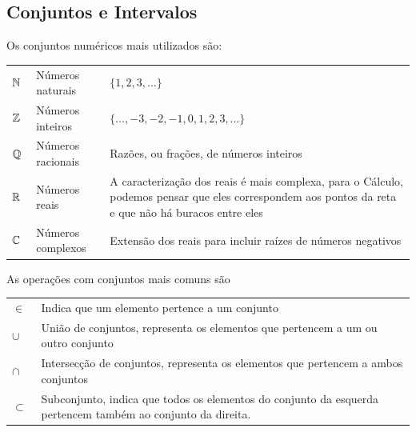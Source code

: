 \subsection*{Conjuntos e Intervalos}
\label{sub:conjuntos_intervalos}

Os conjuntos numéricos mais utilizados são:

{\centering
\begin{tabular}{llp{10cm}}
  \emph{$\mathbb{N}\;$} & Números naturais  & $\{1, 2, 3, \dots\}$ \\
  \emph{$\mathbb{Z}\;$} & Números inteiros  & $\{\dots, -3, -2, -1, 0, 1, 2, 3, \dots\}$ \\
  \emph{$\mathbb{Q}\;$} & Números racionais & Razões, ou frações, de números inteiros \\
  \emph{$\mathbb{R}\;$} & Números reais     & A caracterização dos reais é mais complexa,
                                      para o Cálculo, podemos pensar que eles correspondem
                                      aos pontos da reta e que não há buracos entre eles \\
  \emph{$\mathbb{C}\;$} & Números complexos & Extensão dos reais para incluir raízes de números negativos
\end{tabular}\par}

As operações com conjuntos mais comuns são

{\centering
\begin{tabular}{lp{15cm}}
  \emph{$\in\;$}     & Indica que um elemento pertence a um conjunto \\
  \emph{$\cup\;$}    & União de conjuntos, representa os elementos que pertencem a um ou outro conjunto \\
  \emph{$\cap\;$}    & Intersecção de conjuntos, representa os elementos que pertencem a ambos conjuntos \\
  \emph{$\subset\;$} & Subconjunto, indica que todos os elementos do conjunto da esquerda pertencem
                       também ao conjunto da direita.
\end{tabular}\par}

